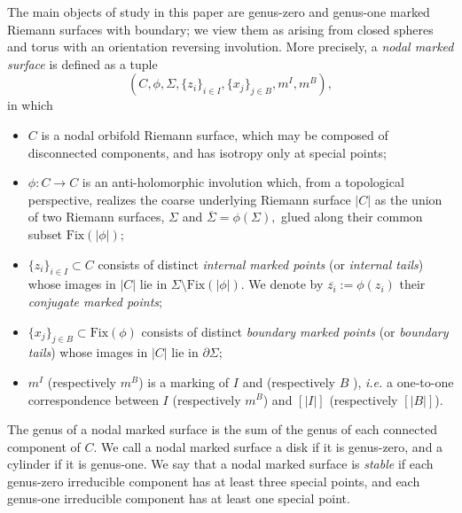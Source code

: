 \documentclass[11pt]{amsart}
\theoremstyle{definition}
\theoremstyle{remark}
\newcommand{\<}{\left<}
\renewcommand{\>}{\right>}
\numberwithin{equation}{section}
\begin{document}
The main objects of study in this paper are genus-zero and genus-one marked Riemann surfaces with boundary; we view them as arising from closed spheres %
and torus with %
an orientation reversing involution. %
More precisely, a \textit{nodal marked surface} is defined as a %
tuple
$$(C, \phi, \Sigma, \{z_i\}_{i \in I}, \{x_j\}_{j \in B}, m^I, m^B),$$
in %
which
\begin{itemize}
\item  $C$ is a nodal orbifold %
Riemann surface, which %
may be composed of %
disconnected components, and %
has isotropy only at special points;
\item $\phi: C \to C$ is an anti-holomorphic involution which, from a topological perspective, realizes the coarse underlying Riemann surface $|C|$  as the union of two Riemann surfaces, $\Sigma$ and $\overline{\Sigma}=\phi(\Sigma),$ glued along their common subset $\text{Fix}(|\phi|)$;
\item $\{z_i\}_{i \in I}\subset  C$ consists of distinct \textit{internal marked points} (or \textit{internal tails}) whose images in $|C|$ lie in $\Sigma\setminus\text{Fix}(|\phi|)$. We denote by $\overline{z_i}:= \phi(z_i)$ their \textit{conjugate marked points};
\item $\{x_j\}_{j \in B} \subset \text{Fix}(\phi)$ consists of distinct \textit{boundary marked points} (or \textit{boundary tails}) whose images in $|C|$ lie in ${\partial} \Sigma$;
\item $m^I$ (respectively $m^B$) is a marking of $I$ and (respectively $B$%
), \textit{i.e.} a %
one-to-one correspondence between  $I$ (respectively $m^B$) and $\left[\lvert I \rvert\right]$ (respectively $[\lvert B \rvert]$).
\end{itemize}
The genus of a nodal marked surface is the sum of the genus of each connected component of $C$. We call a nodal marked surface a disk if it %
is genus-zero, and %
a cylinder if it is genus-one.
We say that a nodal marked surface is \textit{stable} if each genus-zero irreducible component has at least three special points, and each genus-one irreducible component has at least one special point.
\end{document}
